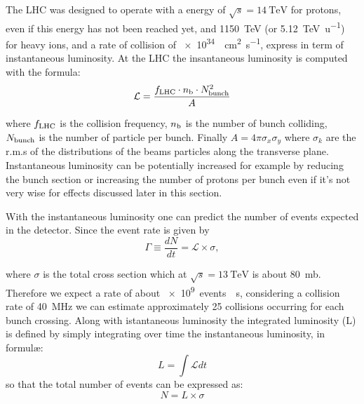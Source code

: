 The LHC was designed to operate with a \cm energy of $\sqrt{s}=\SI{14}{\TeV} $ for protons, even if this energy has not been reached yet, and \SI{1150}{\TeV} (or \SI{5.12}{\TeV\per\amu}) for heavy ions, and a rate of collision of \SI{e34}{\per \cm \squared \per \s}, express in term of instantaneous luminosity. 
At the LHC the insantaneous luminosity is computed with the formula:
\begin{equation}
	\mathcal{L}=\frac{f_{\textup{LHC}} \cdot n_{\textup{b}} \cdot N_{\textup{bunch}}^2}{A}
\end{equation}

where $f_{\textup{LHC}}$ is the collision frequency, $n_{\textup{b}}$ is the number of bunch colliding, $N_{\textup{bunch}}$ is the number of particle per bunch. Finally $A=4\pi\sigma_x\sigma_y$ where $\sigma_k$ are the r.m.s of the distributions of the beams particles along the transverse plane. Instantaneous luminosity can be potentially increased for example by reducing the bunch section or increasing the number of protons per bunch even if it's not very wise for effects discussed later in this section.

With the instantaneous luminosity one can predict the number of events expected in the detector. Since the event rate is given by 
\begin{equation}
\Gamma\equiv\frac{dN}{dt}=\mathcal{L}\times\sigma,
\end{equation}

where $\sigma$ is the total \pp cross section which at $\sqrt{s}=\SI{13}{\TeV}$ is about \SI{80}{mb}. Therefore we expect a rate of about \SI{e9}{events \per\s}, considering a collision rate of \SI{40}{\MHz} we can estimate approximately 25 collisions occurring for each bunch crossing. Along with istantaneous luminosity the integrated luminosity (L) is defined by simply integrating over time the instantaneous luminosity, in formul\ae:
\begin{equation}
	L=\int{\mathcal{L}dt}
\end{equation} 
so that the total number of events can be expressed as:
\begin{equation}
N=L\times\sigma
\end{equation}

